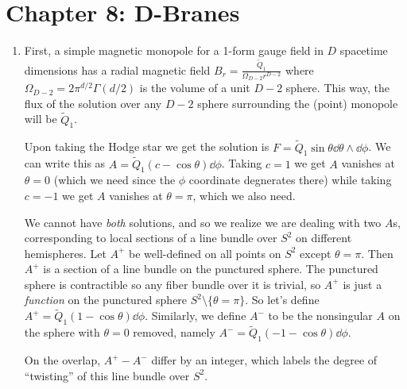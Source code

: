\documentclass[11pt, class=article, crop=false]{standalone}
\begin{document}
\section*{Chapter 8: D-Branes} %
\label{sec:chapter_8_d_branes}

\begin{enumerate}
	\item First, a simple magnetic monopole for a 1-form gauge field in $D$ spacetime dimensions has a radial magnetic field $B_r = \frac{\tilde Q_1}{\Omega_{D-2} r^{D-2}}$ where $\Omega_{D-2} = 2 \pi^{d/2} \Gamma(d/2)$ is the volume of a unit $D-2$ sphere. This way, the flux of the solution over any $D-2$ sphere surrounding the (point) monopole will be $\tilde Q_1$.
	
	Upon taking the Hodge star we get the solution is $F = \tilde Q_1 \sin \theta \dd \theta \wedge \dd \phi$. We can write this as $A = \tilde Q_1 (c - \cos \theta) \dd \phi$. Taking $c = 1$ we get $A$ vanishes at $\theta = 0$ (which we need since the $\phi$ coordinate degnerates there) while taking $c = -1$ we get $A$ vanishes at $\theta = \pi$, which we also need.
	
	We cannot have \emph{both} solutions, and so we realize we are dealing with two $A$s, corresponding to local sections of a line bundle over $S^2$ on different hemispheres. Let $A^+$ be well-defined on all points on $S^2$ except $\theta = \pi$. Then $A^+$ is a section of a line bundle on the punctured sphere. The punctured sphere is contractible so any fiber bundle over it is trivial, so $A^+$ is just a \emph{function} on the punctured sphere $S^2 \setminus \{\theta = \pi\}$. So let's define $A^+ = \tilde Q_1 (1- \cos \theta) \dd \phi$. Similarly, we define $A^-$ to be the nonsingular $A$ on the sphere with $\theta = 0$ removed, namely $A^- = \tilde Q_1 (-1 -\cos \theta) \dd \phi$. 
	
	On the overlap, $A^+ - A^-$ differ by an integer, which labels the degree of ``twisting'' of this line bundle over $S^2$. 
	

\end{enumerate}
\end{document}
